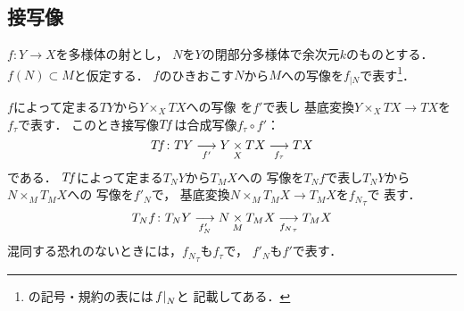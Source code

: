 \subsection*{接写像}
\(f\colon Y\to X\)を多様体の射とし，
\(N\)を\(Y\)の閉部分多様体で余次元\(k\)のものとする．
\(f(N)\subset M\)と仮定する．
\(f\)のひきおこす\(N\)から\(M\)への写像を\(f_{|N}\)で表す\footnote{
    \cite[p.503]{KS90}の記号・規約の表には\(\mres[f]{N}\)と
    記載してある．
}．

\(f\)によって定まる\(TY\)から\(Y\times_{X}TX\)への写像
を\(f'\)で表し
基底変換\(Y\times_{X}TX\to TX\)を\(f_{\tau}\)で表す．
このとき接写像\(\mtan[f]\)は合成写像\(f_{\tau}\circ f'\)：
\begin{equation}
    \mtan[f]\colon TY\underset{f'}{\longrightarrow}
    Y\pb[X]TX\underset{f_{\tau}}{\longrightarrow} TX
\end{equation}
である．
\(\mtan[f]\)によって定まる\(T_{N}Y\)から\(T_{M}X\)への
写像を\(T_{N}f\)で表し\(T_{N}Y\)から\(N\times_{M}T_{M}X\)への
写像を\(f'_{N}\)で，
基底変換\(N\times_{M}T_{M}X\to T_{M}X\)を\({f_{N}}_{\tau}\)で
表す．
\begin{equation}
    T_{N}f\colon T_{N}Y\underset{f'_{N}}{\longrightarrow}
    N\pb[M]T_{M}X\underset{{f_{N}}_{\tau}}{\longrightarrow} T_{M}X
\end{equation}
混同する恐れのないときには，\({f_{N}}_{\tau}\)も\(f_{\tau}\)で，
\({f'_{N}}\)も\(f'\)で表す．

